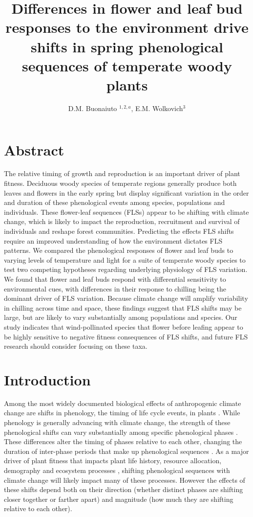 \documentclass[11pt]{article}\usepackage[]{graphicx}\usepackage[]{color}
\title{Differences in flower and leaf bud responses to the environment drive shifts in spring phenological sequences of temperate woody plants}\\
\date{}
\author{D.M. Buonaiuto $^{1,2,a}$, E.M. Wolkovich$^{3}$}
\begin{document}
\maketitle
\section*{Abstract} 
The relative timing of growth and reproduction is an important driver of plant fitness. Deciduous woody species of temperate regions generally produce both leaves and flowers in the early spring but display significant variation in the order and duration of these phenological events among species, populations and individuals. These flower-leaf sequences (FLSs) appear to be shifting with climate change, which is likely to impact the reproduction, recruitment and survival of individuals and reshape forest communities. Predicting the effects FLS shifts require an improved understanding of how the environment dictates FLS patterns. We compared the phenological responses of flower and leaf buds to varying levels of temperature and light for a suite of temperate woody species to test two competing hypotheses regarding underlying physiology of FLS variation. We found that flower and leaf buds respond with differential sensitivity to environmental cues, with differences in their response to chilling being the dominant driver of FLS variation. Because climate change will amplify variability in chilling across time and space, these findings suggest that FLS shifts may be large, but are likely to vary substantially among populations and species. Our study indicates that wind-pollinated species that flower before leafing appear to be highly sensitive to negative fitness consequences of FLS shifts, and future FLS research should consider focusing on these taxa.   

\section*{Introduction}
\noindent Among the most widely documented biological effects of anthropogenic climate change are shifts in phenology, the timing of life cycle events, in plants \citep{Parmesan2003,Menzel2006,Cleland2007}. While phenology is generally advancing with climate change, the strength of these phenological shifts can vary substantially among specific phenological phases \citep{Augspurger:2020aa}. These differences alter the timing of phases relative to each other, changing the duration of inter-phase periods that make up phenological sequences \citep{Ettinger2018}. As a major driver of plant fitness that impacts plant life history, resource allocation, demography and ecosystem processes \citep{Post:2008aa}, shifting phenological sequences with climate change will likely impact many of these processes. However the effects of these shifts depend both on their direction (whether distinct phases are shifting closer together or farther apart) and magnitude (how much they are shifting relative to each other).\\ 
\end{document}
